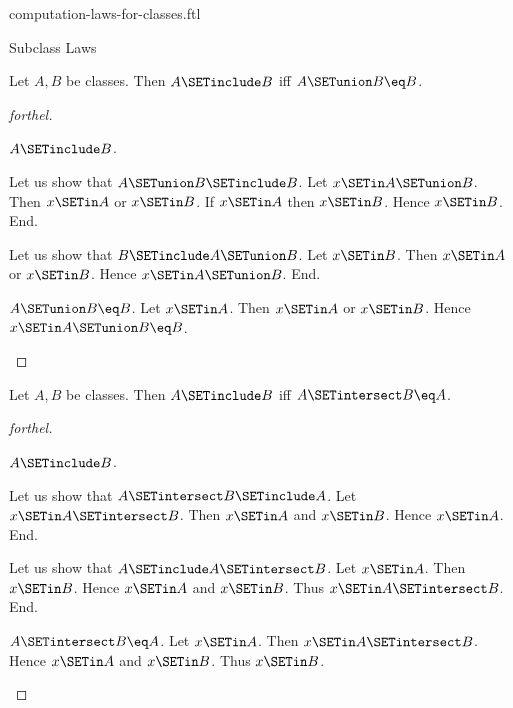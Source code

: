 \documentclass{naproche-library}
\begin{document}
\begin{smodule}[title=Computation Laws For Classes]{computation-laws-for-classes.ftl}
\begin{sfragment}{Subclass Laws}
  \begin{proposition}[forthel,id=FOUNDATIONS_02_6657236858306560]
    Let $A, B$ be classes.
    Then $A \SETinclude B$ iff $A \SETunion B \eq B$.
  \end{proposition}
  \begin{proof}[forthel]
    \begin{case}{$A \SETinclude B$.}

      Let us show that $A \SETunion B \SETinclude B$.
        Let $x \SETin A \SETunion B$.
        Then $x \SETin A$ or $x \SETin B$.
        If $x \SETin A$ then $x \SETin B$.
        Hence $x \SETin B$.
      End.

      Let us show that $B \SETinclude A \SETunion B$.
        Let $x \SETin B$.
        Then $x \SETin A$ or $x \SETin B$.
        Hence $x \SETin A \SETunion B$.
      End.
    \end{case}

    \begin{case}{$A \SETunion B \eq B$.}
      Let $x \SETin A$.
      Then $x \SETin A$ or $x \SETin B$.
      Hence $x \SETin A \SETunion B \eq B$.
    \end{case}
  \end{proof}

  \begin{proposition}[forthel,id=FOUNDATIONS_02_2356449346846720]
    Let $A, B$ be classes.
    Then $A \SETinclude B$ iff $A \SETintersect B \eq A$.
  \end{proposition}
  \begin{proof}[forthel]
    \begin{case}{$A \SETinclude B$.}

      Let us show that $A \SETintersect B \SETinclude A$.
        Let $x \SETin A \SETintersect B$.
        Then $x \SETin A$ and $x \SETin B$.
        Hence $x \SETin A$.
      End.

      Let us show that $A \SETinclude A \SETintersect B$.
        Let $x \SETin A$.
        Then $x \SETin B$.
        Hence $x \SETin A$ and $x \SETin B$.
        Thus $x \SETin A \SETintersect B$.
      End.
    \end{case}

    \begin{case}{$A \SETintersect B \eq A$.}
      Let $x \SETin A$.
      Then $x \SETin A \SETintersect B$.
      Hence $x \SETin A$ and $x \SETin B$.
      Thus $x \SETin B$.
    \end{case}
  \end{proof}
\end{sfragment}


\end{smodule}
\end{document}
